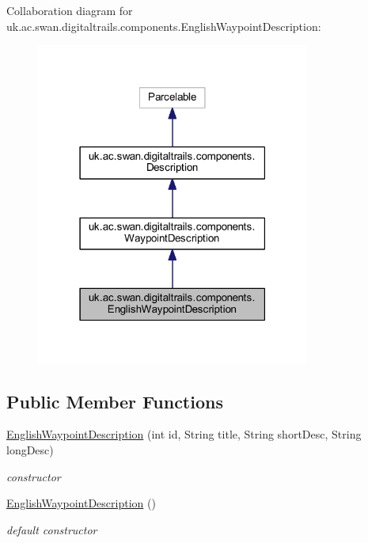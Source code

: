 Collaboration diagram for uk.\+ac.\+swan.\+digitaltrails.\+components.\+English\+Waypoint\+Description\+:\nopagebreak
\begin{figure}[H]
\begin{center}
\leavevmode
\includegraphics[width=255pt]{classuk_1_1ac_1_1swan_1_1digitaltrails_1_1components_1_1_english_waypoint_description__coll__graph}
\end{center}
\end{figure}
\subsection*{Public Member Functions}
\begin{DoxyCompactItemize}
\item 
\hyperlink{classuk_1_1ac_1_1swan_1_1digitaltrails_1_1components_1_1_english_waypoint_description_af1a019a4e5496a032f2fe66192f106ef}{English\+Waypoint\+Description} (int id, String title, String short\+Desc, String long\+Desc)
\begin{DoxyCompactList}\small\item\em constructor \end{DoxyCompactList}\item 
\hyperlink{classuk_1_1ac_1_1swan_1_1digitaltrails_1_1components_1_1_english_waypoint_description_aca73e7b961e066f23d130939564d5be5}{English\+Waypoint\+Description} ()
\begin{DoxyCompactList}\small\item\em default constructor \end{DoxyCompactList}\end{DoxyCompactItemize}
